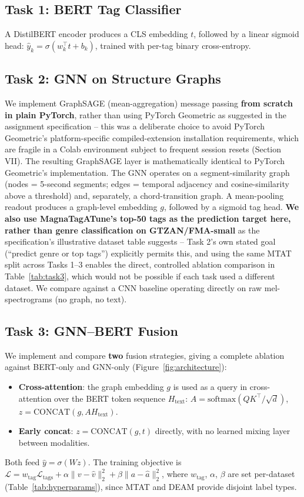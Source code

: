 \documentclass[conference]{IEEEtran}
\begin{document}
\subsection{Task 1: BERT Tag Classifier}
A DistilBERT encoder produces a CLS embedding $t$, followed by a linear
sigmoid head: $\hat{y}_k = \sigma(w_k^\top t + b_k)$, trained with
per-tag binary cross-entropy.

\subsection{Task 2: GNN on Structure Graphs}
We implement GraphSAGE (mean-aggregation) message passing
\textbf{from scratch in plain PyTorch}, rather than using PyTorch
Geometric as suggested in the assignment specification -- this was a
deliberate choice to avoid PyTorch Geometric's platform-specific
compiled-extension installation requirements, which are fragile in a
Colab environment subject to frequent session resets (Section VII).
The resulting GraphSAGE layer is mathematically identical to PyTorch
Geometric's implementation. The GNN operates on a segment-similarity
graph (nodes = 5-second segments; edges = temporal adjacency and
cosine-similarity above a threshold) and, separately, a
chord-transition graph. A mean-pooling readout produces a graph-level
embedding $g$, followed by a sigmoid tag head. \textbf{We also use
MagnaTagATune's top-50 tags as the prediction target here, rather than
genre classification on GTZAN/FMA-small} as the specification's
illustrative dataset table suggests -- Task 2's own stated goal
(``predict genre or top tags'') explicitly permits this, and using the
same MTAT split across Tasks 1--3 enables the direct, controlled
ablation comparison in Table~\ref{tab:task3}, which would not be
possible if each task used a different dataset. We compare against a
CNN baseline operating directly on raw mel-spectrograms (no graph, no
text).

\subsection{Task 3: GNN--BERT Fusion}
We implement and compare \textbf{two} fusion strategies, giving a
complete ablation against BERT-only and GNN-only (Figure~\ref{fig:architecture}):
\begin{itemize}
\item \textbf{Cross-attention}: the graph embedding $g$ is used as a
query in cross-attention over the BERT token sequence $H_{\text{text}}$:
$A = \text{softmax}(QK^\top/\sqrt{d})$, $z = \text{CONCAT}(g, AH_{\text{text}})$.
\item \textbf{Early concat}: $z = \text{CONCAT}(g, t)$ directly, with
no learned mixing layer between modalities.
\end{itemize}
Both feed $\hat{y} = \sigma(Wz)$. The training objective is
$\mathcal{L} = w_{\text{tag}}\mathcal{L}_{\text{tags}}
+ \alpha\|v-\hat{v}\|_2^2 + \beta\|a-\hat{a}\|_2^2$, where $w_{\text{tag}}$,
$\alpha$, $\beta$ are set per-dataset (Table~\ref{tab:hyperparams}),
since MTAT and DEAM provide disjoint label types.
\end{document}
